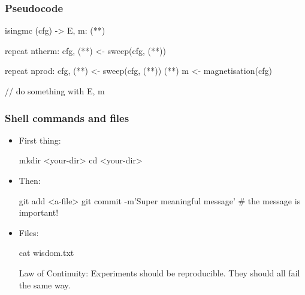 \documentclass[mathserif, fleqn]{beamer}
\begin{document}
\begin{frame}[fragile]\frametitle{Pseudocode}
  \begin{aiphipseudo}[emph={isingmc}, caption={Some MC pseudocode}]
isingmc (cfg) -> E, m:
    (**)

    repeat ntherm:
        cfg, (**) <- sweep(cfg, (**))

    repeat nprod:
        cfg, (**) <- sweep(cfg, (**))
        (**)
        m <- magnetisation(cfg)

        // do something with E, m
  \end{aiphipseudo}
\end{frame}

\begin{frame}[fragile]\frametitle{Shell commands and files}
  \begin{itemize}
  \item First thing:
    \begin{shell}[]
mkdir <your-dir>
cd <your-dir>
    \end{shell}
  \item Then:
    \begin{shell}[]
git add <a-file>
git commit -m'Super meaningful message'  # the message is important!
    \end{shell}
  \item Files:
    \begin{shell}[]
cat wisdom.txt
    \end{shell}
    \begin{file}[]
Law of Continuity:
    Experiments should be reproducible.  They should all fail the same way.
    \end{file}
  \end{itemize}
\end{frame}
\end{document}
